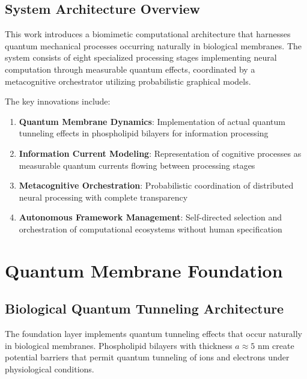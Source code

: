 \documentclass[12pt,a4paper]{article}
\begin{document}
\subsection{System Architecture Overview}

This work introduces a biomimetic computational architecture that harnesses quantum mechanical processes occurring naturally in biological membranes. The system consists of eight specialized processing stages implementing neural computation through measurable quantum effects, coordinated by a metacognitive orchestrator utilizing probabilistic graphical models.

The key innovations include:
\begin{enumerate}
\item \textbf{Quantum Membrane Dynamics}: Implementation of actual quantum tunneling effects in phospholipid bilayers for information processing
\item \textbf{Information Current Modeling}: Representation of cognitive processes as measurable quantum currents flowing between processing stages  
\item \textbf{Metacognitive Orchestration}: Probabilistic coordination of distributed neural processing with complete transparency
\item \textbf{Autonomous Framework Management}: Self-directed selection and orchestration of computational ecosystems without human specification
\end{enumerate}

\section{Quantum Membrane Foundation}

\subsection{Biological Quantum Tunneling Architecture}

The foundation layer implements quantum tunneling effects that occur naturally in biological membranes. Phospholipid bilayers with thickness $a \approx 5$ nm create potential barriers that permit quantum tunneling of ions and electrons under physiological conditions.
\end{document}
